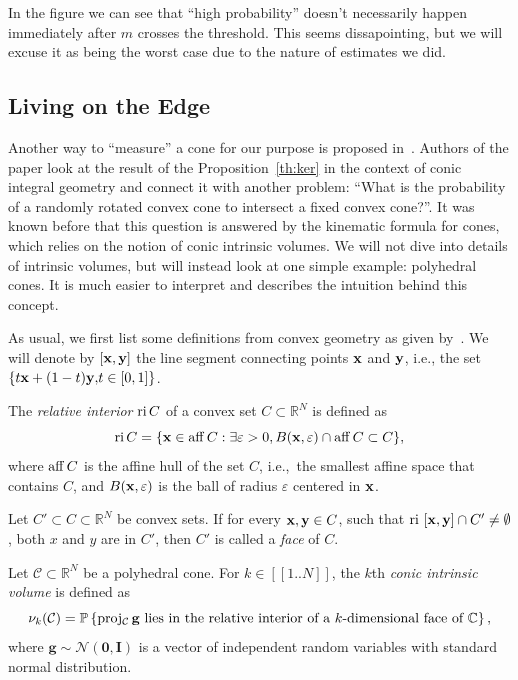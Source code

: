 \begin{remark}
    In the figure we can see that ``high probability'' doesn't necessarily happen immediately after $m$ crosses the threshold.
    This seems dissapointing, but we will excuse it as being the worst case due to the nature of estimates we did.
\end{remark}

\subsection{Living on the Edge}

Another way to ``measure'' a cone for our purpose is proposed in~\cite{lote}.
Authors of the paper look at the result of the Proposition~\ref{th:ker} in the context of conic integral geometry
and connect it with another problem: ``What is the probability of a randomly rotated convex cone to intersect a fixed convex cone?''.
It was known before that this question is answered by the kinematic formula for cones, which relies on the notion of conic intrinsic volumes.
We will not dive into details of intrinsic volumes, but will instead look at one simple example: polyhedral cones.
It is much easier to interpret and describes the intuition behind this concept.

As usual, we first list some definitions from convex geometry as given by~\cite{rockafellar}.
We will denote by $[\mathbf{x}, \mathbf{y}]$ the line segment connecting points $\mathbf{x}$ and $\mathbf{y}$, i.e., the set $\{{t\mathbf{x} + (1-t)\mathbf{y},} \\ {t \in [0, 1]} \}$.

\begin{definition}
    The \textit{relative interior} $\operatorname{ri} C$ of a convex set $C \subset \mathbb{R}^N$ is defined as
    \[ \operatorname{ri} C = \{ \mathbf{x} \in \operatorname{aff} C: \exists \varepsilon>0, B(\mathbf{x}, \varepsilon) \cap \operatorname{aff} C \subset C \},\]
    where $\operatorname{aff} C$ is the affine hull of the set $C$, i.e.,\ the smallest affine space that contains $C$,
    and $B(\mathbf{x}, \varepsilon)$ is the ball of radius $\varepsilon$ centered in $\mathbf{x}$.
\end{definition}

\begin{definition}
    Let $C' \subset C \subset \mathbb{R}^N$ be convex sets.
    If for every $\mathbf{x}, \mathbf{y} \in C$, such that $\operatorname{ri}~[\mathbf{x}, \mathbf{y} ] \cap C' \neq \emptyset$, both $x$ and $y$ are in $C'$,
    then $C'$ is called a \textit{face} of $C$.
\end{definition}

\begin{definition}
    Let $\mathcal{C} \subset \mathbb{R}^N$ be a polyhedral cone.
    For $k \in [\![ 1..N ]\!]$, the $k$th \textit{conic intrinsic volume} is defined as
    \[ \nu_k(\mathcal{C}) = \mathbb{P} \left\{ \operatorname{proj_\mathcal{C}} \mathbf{g} \text{ lies in the relative interior
    of a $k$-dimensional face of $\mathbb{C}$} \right\}, \]
    where $\mathbf{g} \sim \mathcal{N}(\mathbf{0}, \mathbf{I})$ is a vector of independent random variables with standard normal distribution.
\end{definition}

